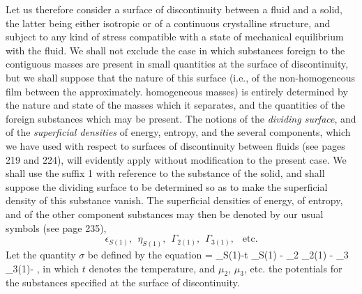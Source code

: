 \documentclass[12pt]{memoir}
\begin{document}
Let us therefore consider a surface of discontinuity between a fluid and a solid, the latter being either isotropic or of a continuous crystalline structure, and subject to any kind of stress compatible with a state of mechanical equilibrium with the fluid. We shall not exclude the case in which substances foreign to the contiguous masses are present in small quantities at the surface of discontinuity, but we shall suppose that the nature of this surface (i.e., of the non-homogeneous film between the approximately. homogeneous masses) is entirely determined by the nature and state of the masses which it separates, and the quantities of the foreign substances which may be present. The notions of the \textit{dividing surface}, and of the \textit{superficial densities} of energy, entropy, and the several components, which we have used with respect to surfaces of discontinuity between fluids (see pages 219 and 224), will evidently apply without modification to the present case. We shall use the suffix 1 with reference to the substance of the solid, and shall suppose the dividing surface to be determined so as to make the superficial density of this substance vanish. The superficial densities of energy, of entropy, and of the other component substances may then be denoted by our usual symbols (see page 235),
$$ \epsilon_{S(1)}, \ \ \eta_{S(1)}, \ \ \Gamma_{2(1)}, \ \ \Gamma_{3(1)},\ \  \text{ etc.}$$
Let the quantity $\sigma$ be defined by the equation
\eqs \sigma = \epsilon_{S(1)}-t \eta_{S(1)} - \mu_2 \Gamma_{2(1)} - \mu_3 \Gamma_{3(1)}- ,  \label{659} \eqe
in which $t$ denotes the temperature, and $\mu_2$, $\mu_3$, etc. the potentials for the substances specified at the surface of discontinuity.
\end{document}
